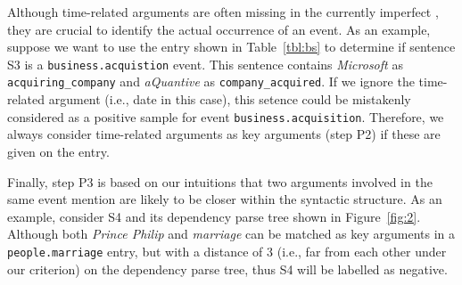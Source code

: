 Although time-related arguments are often missing in the currently imperfect \KBs, they are crucial to identify the actual occurrence of an
event. As an example, suppose we want to use the \CVT entry shown in Table~\ref{tbl:bs} to determine if sentence S3 is a
\texttt{business.acquistion} event. This sentence contains \emph{Microsoft} as \texttt{acquiring\_company} and \emph{aQuantive} as
\texttt{company\_acquired}. If we ignore the time-related argument (i.e., date in this case), this setence could be mistakenly considered
as a positive sample for event \texttt{business.acquisition}. Therefore, we always consider time-related arguments as key arguments (step
P2) if these are given on the \CVT entry.

Finally, step P3 is based on our intuitions that two arguments involved in the same event mention are likely to be closer within the
syntactic structure. As an example, consider S4 and its dependency parse tree shown in Figure~\ref{fig:2}. Although both \emph{Prince
Philip} and \emph{marriage} can be matched as key arguments in a  \texttt{people.marriage} entry, but with a distance of 3 (i.e., far from
each other under our criterion) on the dependency parse tree, thus S4 will be labelled as negative.
